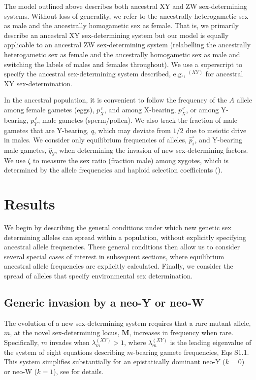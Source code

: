 \documentclass[10pt,letterpaper]{article}
\begin{document}
The model outlined above describes both ancestral XY and ZW sex-determining systems. 
Without loss of generality, we refer to the ancestrally heterogametic sex as male and the ancestrally homogametic sex as female.
That is, we primarily describe an ancestral XY sex-determining system but our model is equally applicable to an ancestral ZW sex-determining system (relabelling the ancestrally heterogametic sex as female and the ancestrally homogametic sex as male and switching the labels of males and females throughout). 
We use a superscript to specify the ancestral sex-determining system described, e.g., $^{(XY)}$ for ancestral XY sex-determination.

In the ancestral population, it is convenient to follow the frequency of the $A$ allele among female gametes (eggs), $p^\female_X$, and among X-bearing, $p^\male_X$, or among Y-bearing, $p^\male_Y$, male gametes (sperm/pollen). 
We also track the fraction of male gametes that are Y-bearing, $q$, which may deviate from $1/2$ due to meiotic drive in males. 
We consider only equilibrium frequencies of alleles, $\hat{p}^\circ_i$, and Y-bearing male gametes, $\hat{q}_{Y}$, when determining the invasion of new sex-determining factors.
We use $\zeta$ to measure the sex ratio (fraction male) among zygotes, which is determined by the allele frequencies and haploid selection coefficients ().

\section*{Results}

We begin by describing the general conditions under which new genetic sex determining alleles can spread within a population, without explicitly specifying ancestral allele frequencies.
These general conditions then allow us to consider several special cases of interest in subsequent sections, where equilibrium ancestral allele frequencies are explicitly calculated.
Finally, we consider the spread of alleles that specify environmental sex determination. 

\subsection*{Generic invasion by a neo-Y or neo-W}

The evolution of a new sex-determining system requires that a rare mutant allele, $m$, at the novel sex-determining locus, $\mathbf{M}$, increases in frequency when rare. 
Specifically, $m$ invades when $\lambda_m^{(XY)}>1$, where $\lambda_m^{(XY)}$ is the leading eigenvalue of the system of eight equations describing $m$-bearing gamete frequencies, Eqs S1.1. 
This system simplifies substantially for an epistatically dominant neo-Y ($k=0$) or neo-W ($k=1$), see  for details. 
 
\end{document}
